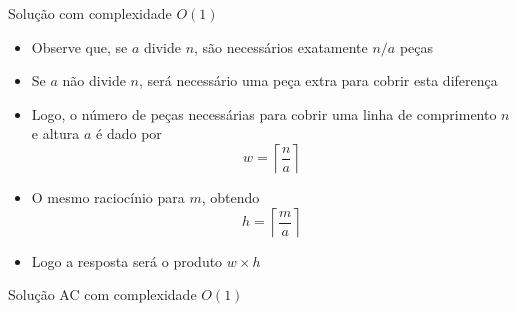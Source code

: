 \begin{frame}[fragile]{Solução com complexidade $O(1)$}

    \begin{itemize}
        \item Observe que, se $a$ divide $n$, são necessários exatamente $n/a$ peças
        \pause

        \item Se $a$ não divide $n$, será necessário uma peça extra para cobrir esta diferença
        \pause

        \item Logo, o número de peças necessárias para cobrir uma linha de comprimento $n$ e 
            altura $a$ é dado por
        \[
            w = \left\lceil \frac{n}{a}\right\rceil
        \]
        \pause

        \item O mesmo raciocínio para $m$, obtendo
        \[
            h = \left\lceil \frac{m}{a}\right\rceil
        \]
        \pause

        \item Logo a resposta será o produto $w \times h$

    \end{itemize}

\end{frame}

\begin{frame}[fragile]{Solução AC com complexidade $O(1)$}
\end{frame}
